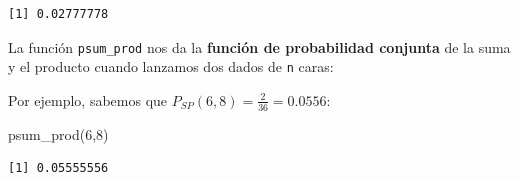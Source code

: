 \documentclass[
  letterpaper,
  DIV=11,
  numbers=noendperiod]{scrreprt}
\newenvironment{Shaded}{\begin{snugshade}}{\end{snugshade}}
\newcommand{\AttributeTok}[1]{\textcolor[rgb]{0.40,0.45,0.13}{#1}}
\newcommand{\ControlFlowTok}[1]{\textcolor[rgb]{0.00,0.23,0.31}{#1}}
\newcommand{\DecValTok}[1]{\textcolor[rgb]{0.68,0.00,0.00}{#1}}
\newcommand{\FunctionTok}[1]{\textcolor[rgb]{0.28,0.35,0.67}{#1}}
\newcommand{\NormalTok}[1]{\textcolor[rgb]{0.00,0.23,0.31}{#1}}
\newcommand{\OtherTok}[1]{\textcolor[rgb]{0.00,0.23,0.31}{#1}}
\newcommand{\SpecialCharTok}[1]{\textcolor[rgb]{0.37,0.37,0.37}{#1}}
\begin{document}
\begin{verbatim}
[1] 0.02777778
\end{verbatim}

La función \texttt{psum\_prod} nos da la \textbf{función de probabilidad
conjunta} de la suma y el producto cuando lanzamos dos dados de
\texttt{n} caras:

\begin{Shaded}
\end{Shaded}

Por ejemplo, sabemos que \(P_{SP}(6,8)=\frac{2}{36}=0.0556\):

\begin{Shaded}
\begin{Highlighting}[]
\FunctionTok{psum\_prod}\NormalTok{(}\DecValTok{6}\NormalTok{,}\DecValTok{8}\NormalTok{)}
\end{Highlighting}
\end{Shaded}

\begin{verbatim}
[1] 0.05555556
\end{verbatim}
\end{document}

